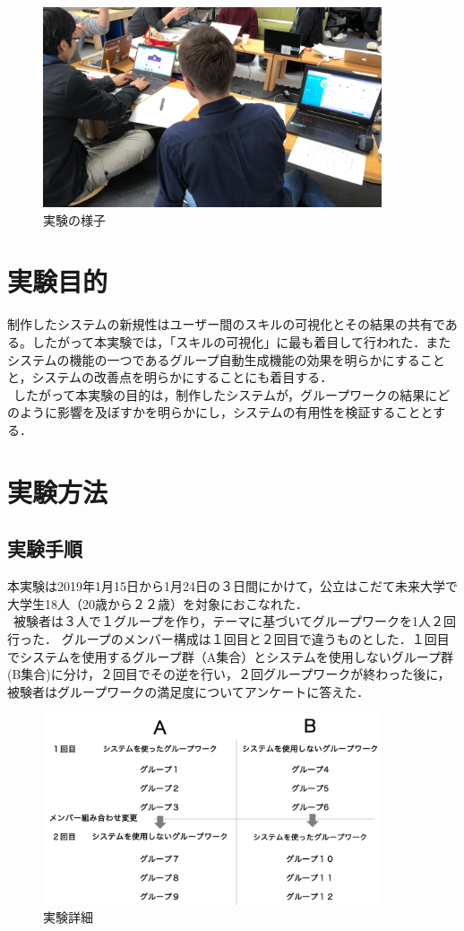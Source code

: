 \documentclass{funthesis}
\begin{document}
\begin{figure}[h]
 \centering
   \includegraphics[width=100mm]{figures/zikkennyousu.png}
 \caption{実験の様子}
 \label{zikkennyousu}
\end{figure}


\section{実験目的}
制作したシステムの新規性はユーザー間のスキルの可視化とその結果の共有である。したがって本実験では，「スキルの可視化」に最も着目して行われた．またシステムの機能の一つであるグループ自動生成機能の効果を明らかにすることと，システムの改善点を明らかにすることにも着目する．\\
\ したがって本実験の目的は，制作したシステムが，グループワークの結果にどのように影響を及ぼすかを明らかにし，システムの有用性を検証することとする．
\section{実験方法}
\subsection{実験手順}
本実験は2019年1月15日から1月24日の３日間にかけて，公立はこだて未来大学で大学生18人（20歳から２２歳）を対象におこなれた．\\
\ 被験者は３人で１グループを作り，テーマに基づいてグループワークを1人２回行った．
グループのメンバー構成は１回目と２回目で違うものとした．１回目でシステムを使用するグループ群（A集合）とシステムを使用しないグループ群(B集合)に分け，２回目でその逆を行い，２回グループワークが終わった後に，被験者はグループワークの満足度についてアンケートに答えた．

\begin{figure}[h]
 \centering
   \includegraphics[width=100mm]{figures/zikken1.png}
 \caption{実験詳細}
 \label{zikken1}
\end{figure}
\end{document}
